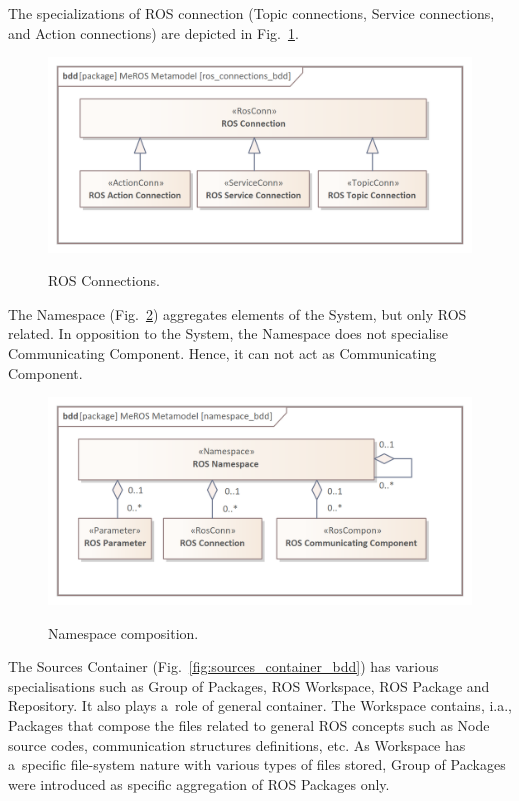 \documentclass[11pt,oneside,a4paper]{report}
\begin{document}
		 The specializations of ROS connection (Topic connections, Service connections, and Action connections) are depicted in Fig.~\ref{fig:ros_connections_bdd}. 
	
	
	\begin{figure}[H]
		\centering
		\begin{center}
			{\includegraphics[scale=1.0]{img/meros_pkg/ros_connections_bdd.png}}
		\end{center}
		\caption{ROS Connections.} 
		\label{fig:ros_connections_bdd}
	\end{figure}

	
	The Namespace (Fig.~\ref{fig:namespace_bdd}) aggregates elements of the System, but only ROS related. In opposition to the System, the Namespace does not specialise Communicating Component. Hence, it can not act as Communicating Component.
	
	
	\begin{figure}[H]
		\centering
		\begin{center}
			{\includegraphics[scale=1.0]{img/meros_pkg/namespace_bdd.png}}
		\end{center}
		\caption{Namespace composition.} 
		\label{fig:namespace_bdd}
	\end{figure}
	
	The Sources Container (Fig.~\ref{fig:sources_container_bdd}) has various specialisations such as Group of Packages, ROS Workspace, ROS Package and Repository. It also plays a~role of general container.  
	The Workspace contains, i.a., Packages that compose the files related to general ROS concepts such as Node source codes, communication structures definitions, etc. As Workspace has a~specific file-system nature with various types of files stored, Group of Packages were introduced as specific aggregation of ROS Packages only.
	
\end{document}
